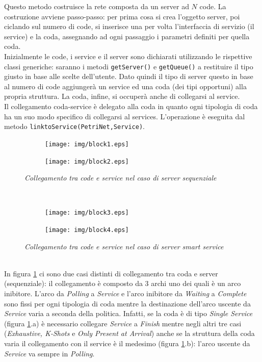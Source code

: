 \documentclass[12pt,a4paper,italian]{article}
\begin{document}
Questo metodo costruisce la rete composta da un server ad $N$ code. La costruzione avviene passo-passo: per prima cosa si crea l'oggetto server, poi ciclando sul numero di code, si inserisce una per volta l'interfaccia di servizio (il service) e la coda, assegnando ad ogni passaggio i parametri definiti per quella coda.\\
Inizialmente le code, i service e il server sono dichiarati utilizzando le rispettive classi generiche: saranno i metodi \texttt{getServer()} e  \texttt{getQueue()} a restituire il tipo giusto in base alle scelte dell'utente. Dato quindi il tipo di server questo in base al numero di code aggiungerà un service ed una coda (dei tipi opportuni) alla propria struttura. La coda, infine, si occuperà anche di collegarsi al service.\\Il collegamento coda-service è delegato alla coda in quanto ogni tipologia di coda ha un suo modo specifico di collegarsi al services. L'operazione è eseguita dal metodo \texttt{linktoService(PetriNet,Service)}.\\
\begin{figure}[h!]
	\begin{subfigure}{.5\textwidth}
		\centering
		\texttt{[image: img/block1.eps]}
		\caption{}
	\end{subfigure}%
	\begin{subfigure}{.5\textwidth}
		\centering
		\texttt{[image: img/block2.eps]}
		\caption{}
	\end{subfigure}
	\caption{\emph{Collegamento tra code e service nel caso di server sequenziale}}
	\label{linktoservice}
\end{figure}\\
\begin{figure}[h!]
	\begin{subfigure}{.5\textwidth}
		\centering
		\texttt{[image: img/block3.eps]}
		\caption{}
	\end{subfigure}
	\begin{subfigure}{.5\textwidth}
		\centering
		\texttt{[image: img/block4.eps]}
		\caption{}
	\end{subfigure}
	\caption{\emph{Collegamento tra code e service nel caso di server smart service}}
	\label{linktoservice2}
\end{figure}\\
In figura \ref{linktoservice} ci sono due casi distinti di collegamento tra coda e server (sequenziale): il collegamento è composto da 3 archi uno dei quali è un arco inibitore. L'arco da \emph{Polling} a \emph{Service} e l'arco inibitore da \emph{Waiting} a \emph{Complete} sono fissi per ogni tipologia di coda mentre la destinazione dell'arco uscente da \emph{Service} varia a seconda della politica. Infatti, se la coda è di tipo \emph{Single Service} (figura \ref{linktoservice}.a) è necessario collegare \emph{Service} a \emph{Finish} mentre negli altri tre casi (\emph{Exhaustive, K-Shots} e \emph{Only Present at Arrival}) anche se la struttura della coda varia il collegamento con il service è il medesimo (figura \ref{linktoservice}.b): l'arco uscente da \emph{Service} va sempre in \emph{Polling}.\\
\end{document}
